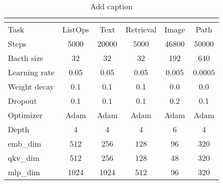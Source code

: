 \begin{table}[htbp]
  \centering
  \caption{Add caption}
    \begin{tabular}{l|ccccc}
    \multicolumn{1}{r}{} &       &       &       &       &  \\
    \midrule
    Task  & ListOps & Text  & Retrieval & Image & Path \\
    \midrule
    Steps & 5000  & 20000 & 5000  & 46800 & 50000 \\
    Bacth size & 32    & 32    & 32    & 192   & 640 \\
    Learning rate & 0.05  & 0.05  & 0.05  & 0.005 & 0.0005 \\
    Weight decay & 0.1   & 0.1   & 0.1   & 0.0   & 0.0 \\
    Dropout & 0.1   & 0.1   & 0.1   & 0.2   & 0.1 \\
    Optimizer & Adam  & Adam  & Adam  & Adam  & Adam \\
    Depth & 4     & 4     & 4     & 6     & 4 \\
    emb\_dim & 512   & 256   & 128   & 96    & 320 \\
    qkv\_dim & 512   & 256   & 128   & 48    & 320 \\
    mlp\_dim & 1024  & 1024  & 512   & 96    & 320 \\
    \bottomrule
    \end{tabular}%
  \label{tab:addlabel}%
\end{table}%
